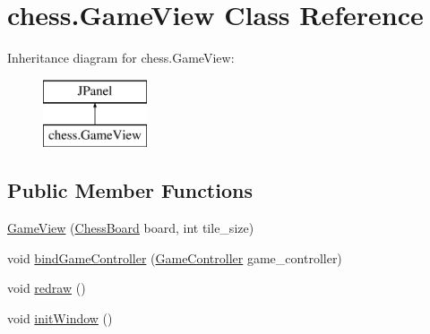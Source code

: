 \hypertarget{classchess_1_1_game_view}{}\section{chess.\+Game\+View Class Reference}
\label{classchess_1_1_game_view}
Inheritance diagram for chess.\+Game\+View\+:\begin{figure}[H]
\begin{center}
\leavevmode
\includegraphics[height=2.000000cm]{classchess_1_1_game_view}
\end{center}
\end{figure}
\subsection*{Public Member Functions}
\begin{DoxyCompactItemize}
\item 
\hyperlink{classchess_1_1_game_view_a2164e6eddc14ec94819cf68f847cc9ec}{Game\+View} (\hyperlink{classchessboard_1_1_chess_board}{Chess\+Board} board, int tile\+\_\+size)
\item 
void \hyperlink{classchess_1_1_game_view_a8e8693a914d8545e48598460879592ec}{bind\+Game\+Controller} (\hyperlink{classchess_1_1_game_controller}{Game\+Controller} game\+\_\+controller)
\item 
void \hyperlink{classchess_1_1_game_view_afd6e597bb751b569b59db40ff455d694}{redraw} ()
\item 
void \hyperlink{classchess_1_1_game_view_abc5fa8b90f8041721614f2d56fec164e}{init\+Window} ()
\end{DoxyCompactItemize}
